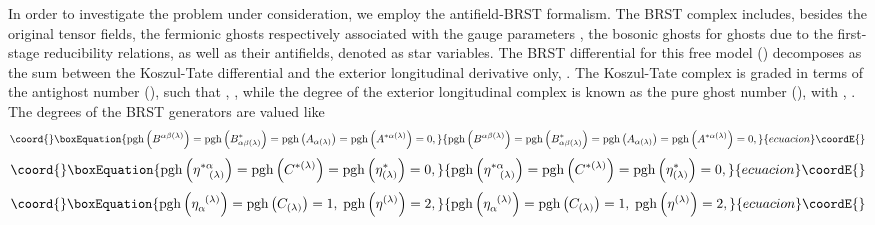\documentclass[a4paper,12pt]{article}
\begin{document}
In order to investigate the problem under consideration, we employ the
antifield-BRST formalism. The BRST complex includes, besides the original
tensor fields, the fermionic ghosts \coordHE{} respectively associated with the gauge
parameters \myHighlight{$\left( \epsilon _{(\lambda )},\epsilon _{\alpha }^{\;\;(\lambda
)}\right) $}\coordHE{}, the bosonic ghosts for ghosts \myHighlight{$\eta ^{(\lambda )}$}\coordHE{} due to the
first-stage reducibility relations, as well as their antifields, denoted as
star variables. The BRST differential for this free model (\coordHE{}) decomposes
as the sum between the Koszul-Tate differential and the exterior
longitudinal derivative only, \coordHE{}. The Koszul-Tate complex
is graded in terms of the antighost number (\coordHE{}), such that \coordHE{}, \coordHE{}, while the degree of the exterior longitudinal complex is known as the
pure ghost number (\coordHE{}), with \coordHE{}, \coordHE{}. The degrees of the BRST
generators are valued like
\begin{equation}\coord{}\boxEquation{
\mathrm{pgh}\left( B^{\alpha \beta (\lambda )}\right) =\mathrm{pgh}\left(
B_{\alpha \beta (\lambda )}^{*}\right) =\mathrm{pgh}\left( A_{\alpha
(\lambda )}\right) =\mathrm{pgh}\left( A^{*\alpha (\lambda )}\right) =0,
\label{cin4}
}{
\mathrm{pgh}\left( B^{\alpha \beta (\lambda )}\right) =\mathrm{pgh}\left(
B_{\alpha \beta (\lambda )}^{*}\right) =\mathrm{pgh}\left( A_{\alpha
(\lambda )}\right) =\mathrm{pgh}\left( A^{*\alpha (\lambda )}\right) =0,
}{ecuacion}\coordE{}\end{equation}
\begin{equation}\coord{}\boxEquation{
\mathrm{pgh}\left( \eta _{\;\;\;(\lambda )}^{*\alpha }\right) =\mathrm{pgh}
\left( C^{*(\lambda )}\right) =\mathrm{pgh}\left( \eta _{(\lambda
)}^{*}\right) =0,  \label{cin5}
}{
\mathrm{pgh}\left( \eta _{\;\;\;(\lambda )}^{*\alpha }\right) =\mathrm{pgh}
\left( C^{*(\lambda )}\right) =\mathrm{pgh}\left( \eta _{(\lambda
)}^{*}\right) =0,  }{ecuacion}\coordE{}\end{equation}
\begin{equation}\coord{}\boxEquation{
\mathrm{pgh}\left( \eta _{\alpha }^{\;\;(\lambda )}\right) =\mathrm{pgh}
\left( C_{(\lambda )}\right) =1,\;\mathrm{pgh}\left( \eta ^{(\lambda
)}\right) =2,  \label{cin6}
}{
\mathrm{pgh}\left( \eta _{\alpha }^{\;\;(\lambda )}\right) =\mathrm{pgh}
\left( C_{(\lambda )}\right) =1,\;\mathrm{pgh}\left( \eta ^{(\lambda
)}\right) =2,  }{ecuacion}\coordE{}\end{equation}
\end{document}
